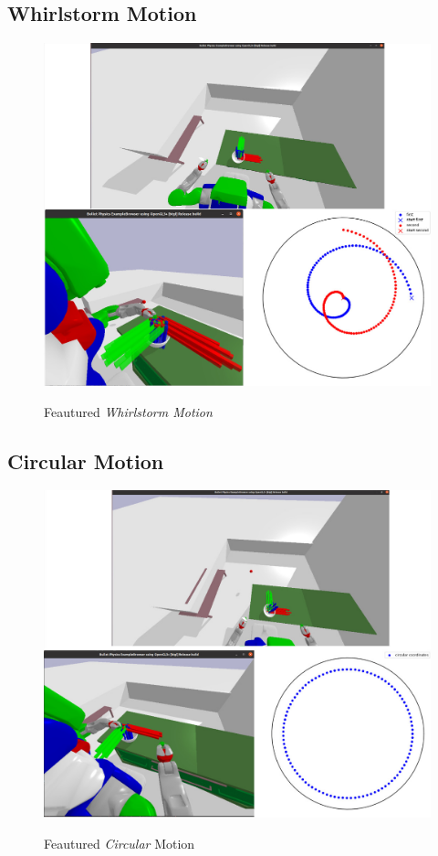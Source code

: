 \subsection*{Whirlstorm Motion}

\begin{figure}[H]
    \includegraphics[scale=0.27]{Graphics/whirlstorm_showcase.jpg}
    \label{fig:whirlstormshowcase}
    \caption{Feautured \textit{Whirlstorm Motion}}
\end{figure}



\subsection*{Circular Motion}

\begin{figure}[H]
    \includegraphics[scale=0.27]{Graphics/circular_showcase.jpg}
    \label{fig:circularshowcase}
    \caption{Feautured \textit{Circular} Motion}
\end{figure}


